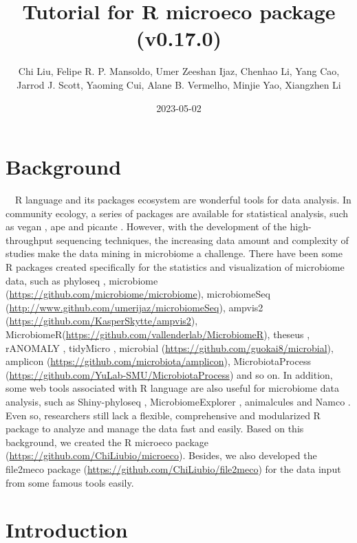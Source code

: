 \documentclass[
]{book}
\title{Tutorial for R microeco package (v0.17.0)}
\author{Chi Liu, Felipe R. P. Mansoldo, Umer Zeeshan Ijaz, Chenhao Li, Yang Cao, Jarrod J. Scott, Yaoming Cui, Alane B. Vermelho, Minjie Yao, Xiangzhen Li}
\date{2023-05-02}
\begin{document}
\maketitle

{
\setcounter{tocdepth}{1}
\tableofcontents
}
\hypertarget{background}{%
\chapter{Background}\label{background}}

　R language \citep{R-base} and its packages ecosystem are wonderful tools for data analysis.
In community ecology, a series of packages are available for statistical analysis,
such as vegan \citep{Jari_vegan_2019}, ape \citep{Paradis_ape_2018} and picante \citep{Picante_Kembel_2010}.
However, with the development of the high-throughput sequencing techniques,
the increasing data amount and complexity of studies make the data mining in microbiome a challenge.
There have been some R packages created specifically for the statistics and visualization of microbiome data,
such as phyloseq \citep{Mcmurdie_phyloseq_2013},
microbiome (\url{https://github.com/microbiome/microbiome}), microbiomeSeq (\url{http://www.github.com/umerijaz/microbiomeSeq}),
ampvis2 (\url{https://github.com/KasperSkytte/ampvis2}), MicrobiomeR(\url{https://github.com/vallenderlab/MicrobiomeR}),
theseus \citep{Price_theseus_2018}, rANOMALY \citep{Theil_rANOMALY_2021},
tidyMicro \citep{Carpenter_tidyMicro_2021}, microbial (\url{https://github.com/guokai8/microbial}),
amplicon (\url{https://github.com/microbiota/amplicon}),
MicrobiotaProcess (\url{https://github.com/YuLab-SMU/MicrobiotaProcess})
and so on.
In addition, some web tools associated with R language are also useful for microbiome data analysis,
such as Shiny-phyloseq \citep{McMurdie_Shiny_2015}, MicrobiomeExplorer \citep{Reeder_MicrobiomeExplorer_2021},
animalcules \citep{Zhao_animalcules_2021} and Namco \citep{Dietrich_Namco_2022}.
Even so, researchers still lack a flexible, comprehensive and modularized R package to analyze and manage the data fast and easily.
Based on this background, we created the R microeco package \citep{Liu_microeco_2021} (\url{https://github.com/ChiLiubio/microeco}).
Besides, we also developed the file2meco package (\url{https://github.com/ChiLiubio/file2meco}) for the data input from some famous tools easily.

\hypertarget{intro}{%
\chapter{Introduction}\label{intro}}
\end{document}
